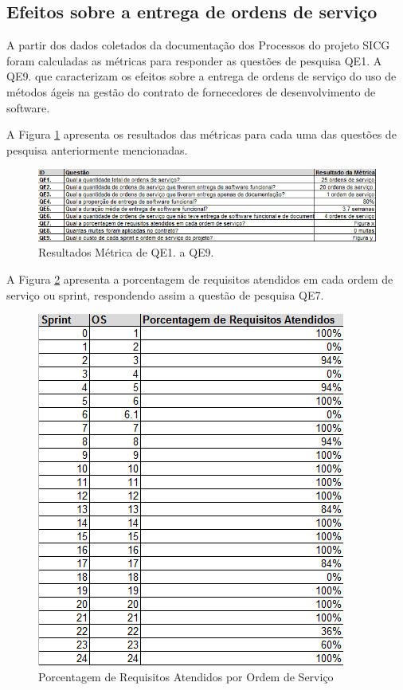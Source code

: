 \subsection[Efeitos sobre a entrega de ordens de serviço]{Efeitos sobre a entrega de ordens de serviço}

A partir dos dados coletados da documentação dos Processos do projeto SICG foram calculadas as métricas para responder as questões de pesquisa QE1. A QE9. que caracterizam os efeitos sobre a entrega de ordens de serviço do uso de métodos ágeis na gestão do contrato de fornecedores de desenvolvimento de software.

A Figura \ref{resultadosmetricas} apresenta os resultados das métricas para cada uma das questões de pesquisa anteriormente mencionadas.

\begin{figure}[H]
		\centering
			\includegraphics[scale=1.0]{figuras/resultadosmetricas.png}
		\caption{Resultados Métrica de QE1. a QE9.}
		\label{resultadosmetricas}
\end{figure}

A Figura \ref{porcentagemrequisitos} apresenta a porcentagem de requisitos atendidos em cada ordem de serviço ou sprint, respondendo assim a questão de pesquisa QE7.

\begin{figure}[H]
		\centering
			\includegraphics[scale=1.0]{figuras/porcentagemrequisitos.png}
		\caption{Porcentagem de Requisitos Atendidos por Ordem de Serviço}
		\label{porcentagemrequisitos}
\end{figure}

